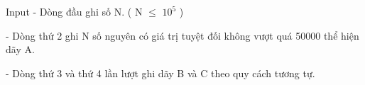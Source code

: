Input
- Dòng đầu ghi số N. ( N  $\le$  $10^{5}$   )  

   - Dòng thứ 2 ghi N số nguyên có giá trị tuyệt đối không vượt quá 50000 thể hiện dãy A.  

   - Dòng thứ 3 và thứ 4 lần lượt ghi dãy B và C theo quy cách tương tự.